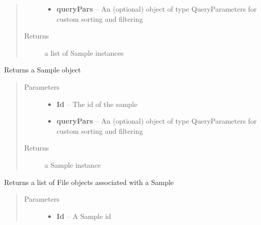 \documentclass[letterpaper,10pt,english]{sphinxmanual}
\begin{document}
\begin{fulllineitems}
\begin{fulllineitems}
\begin{quote}
\begin{description}
\begin{itemize}
\item {} 
\textbf{queryPars} -- An (optional) object of type QueryParameters for custom sorting and filtering

\end{itemize}

\item[{Returns}] \leavevmode
a list of Sample instances

\end{description}\end{quote}

\end{fulllineitems}


\begin{fulllineitems}
\label{Available modules:BaseSpacePy.api.BaseSpaceAPI.BaseSpaceAPI.getSampleById}
Returns a Sample object
\begin{quote}\begin{description}
\item[{Parameters}] \leavevmode\begin{itemize}
\item {} 
\textbf{Id} -- The id of the sample

\item {} 
\textbf{queryPars} -- An (optional) object of type QueryParameters for custom sorting and filtering

\end{itemize}

\item[{Returns}] \leavevmode
a Sample instance

\end{description}\end{quote}

\end{fulllineitems}


\begin{fulllineitems}
\label{Available modules:BaseSpacePy.api.BaseSpaceAPI.BaseSpaceAPI.getSampleFilesById}
Returns a list of File objects associated with a Sample
\begin{quote}\begin{description}
\item[{Parameters}] \leavevmode\begin{itemize}
\item {} 
\textbf{Id} -- A Sample id


\end{itemize}
\end{description}
\end{quote}
\end{fulllineitems}
\end{fulllineitems}
\end{document}
